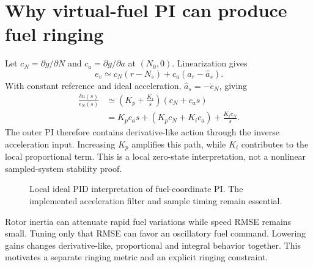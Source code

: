 \documentclass[11pt,a4paper]{article}
\begin{document}
\section{Why virtual-fuel PI can produce fuel ringing}
Let $c_N=\partial g/\partial N$ and $c_a=\partial g/\partial a$ at $(N_0,0)$. Linearization gives
\begin{equation}e_v\simeq c_N(r-N_s)+c_a(a_r-\hat a_s).\end{equation}
With constant reference and ideal acceleration, $\hat a_s=-\dot e_N$, giving
\begin{align}
\frac{\delta u(s)}{e_N(s)}
&\simeq\left(K_p+\frac{K_i}{s}\right)(c_N+c_as)\\
&=K_pc_as+(K_pc_N+K_ic_a)+\frac{K_ic_N}{s}.
\label{eq:localpid}
\end{align}
The outer PI therefore contains derivative-like action through the inverse acceleration input. Increasing $K_p$ amplifies this path, while $K_i$ contributes to the local proportional term. This is a local zero-state interpretation, not a nonlinear sampled-system stability proof.
\begin{figure}[H]\centering{}\caption{Local ideal PID interpretation of fuel-coordinate PI. The implemented acceleration filter and sample timing remain essential.}\end{figure}

Rotor inertia can attenuate rapid fuel variations while speed RMSE remains small. Tuning only that RMSE can favor an oscillatory fuel command. Lowering gains changes derivative-like, proportional and integral behavior together. This motivates a separate ringing metric and an explicit ringing constraint.
\end{document}
